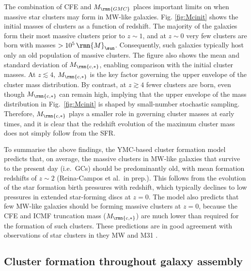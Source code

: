 \documentclass[fleqn,usenatbib]{mnras}
\newcommand\Msun{\,\rmn{M}_{\sun}}
\newcommand{\Mcstar}{M_\rmn{c,\ast}}
\newcommand{\Mgmc}{M_\rmn{GMC}}
\begin{document}
The combination of CFE and $\Mgmc$ places important limits on when massive star clusters may form in MW-like galaxies.
Fig. \ref{fig:Mcinit} shows the initial masses of clusters as a function of redshift. The majority of the galaxies form their most massive clusters prior to $z\sim1$, and at $z \sim 0$ very few clusters are born with masses $> 10^5 \Msun$. Consequently, such galaxies typically host only an old population of massive clusters.
The figure also shows the mean and standard deviation of $\Mcstar$, enabling comparison with the initial cluster masses.
At $z \lesssim 4$, $\Mcstar$ is the key factor governing the upper envelope of the cluster mass distribution. By contrast, at $z \gtrsim 4$ fewer clusters are born, even though $\Mcstar$ can remain high, implying that the upper envelope of the mass distribution in Fig.~\ref{fig:Mcinit} is shaped by small-number stochastic sampling. Therefore, $\Mcstar$ plays a smaller role in governing cluster masses at early times, and it is clear that the redshift evolution of the maximum cluster mass does not simply follow from the SFR.

To summarise the above findings, the YMC-based cluster formation model predicts that, on average, the massive clusters in MW-like galaxies that survive to the present day (i.e.~GCs) should be predominantly old, with mean formation redshifts of $z\sim2$ (Reina-Campos et al.~in prep.). 
This follows from the evolution of the star formation birth pressures with redshift, which typically declines to low pressures in extended star-forming discs at $z=0$. The model also predicts that few MW-like galaxies should be forming massive clusters at $z=0$, because the CFE and ICMF truncation mass ($\Mcstar$) are much lower than required for the formation of such clusters. These predictions are in good agreement with observations of star clusters in they MW and M31 \citep[e.g.][]{Dotter_Sarajedini_and_Anderson_11, Caldwell_et_al_11}.


\subsection{Cluster formation throughout galaxy assembly}
\label{sec:assembly}
\end{document}
